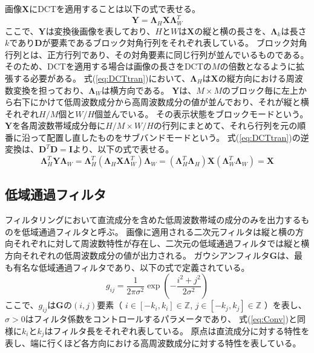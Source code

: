 \documentclass[11pt,a4paper]{jsarticle}
\begin{document}
画像$\mathbf{X}$にDCTを適用することは以下の式で表せる。
\begin{equation}
	\mathbf{Y}=\mathbf{\Lambda}_H
	\mathbf{X\Lambda}^T_W
	\label{eq:DCTtran}
\end{equation}
ここで、$\mathbf{Y}$は変換後画像を表しており、$H$と$W$は$\mathbf{X}$の縦と横の長さを、$\mathbf{\Lambda}_k$は長さ$k$であり$\mathbf{D}$が要素であるブロック対角行列をそれぞれ表している。
ブロック対角行列とは、正方行列であり、その対角要素に同じ行列が並んでいるものである。
そのため、DCTを適用する場合は画像の長さをDCTの$M$の倍数となるように拡張する必要がある。
式(\ref{eq:DCTtran})において、$\mathbf{\Lambda}_H$は$\mathbf{X}$の縦方向における周波数変換を担っており、$\mathbf{\Lambda}_W$は横方向である。
$\mathbf{Y}$は、$M\times M$のブロック毎に左上から右下にかけて低周波数成分から高周波数成分の値が並んでおり、それが縦と横それぞれ$H/M$個と$W/H$個並んでいる。
その表示状態をブロックモードという。
$\mathbf{Y}$を各周波数帯域成分毎に$H/M\times W/H$の行列にまとめて、それら行列を元の順番に沿って配置し直したものをサブバンドモードという。
式(\ref{eq:DCTtran})の逆変換は、$\mathbf{D}^{T}\mathbf{D}=\mathbf{I}$より、以下の式で表せる。
\begin{equation}
	\mathbf{\Lambda}^T_H\mathbf{Y\Lambda}_W
	=\mathbf{\Lambda}^T_H
	\left( \mathbf{\Lambda}_H\mathbf{X\Lambda}^T_W\right)\mathbf{\Lambda}_W
	=\left(\mathbf{\Lambda}^T_H\mathbf{\Lambda}_H\right)
	\mathbf{X}
	\left(\mathbf{\Lambda}^T_W\mathbf{\Lambda}_W\right)
	=\mathbf{X}
	\label{eq:DCTtran_inv}
\end{equation}


\subsection{低域通過フィルタ}\label{sec:Lowpassfilter}
フィルタリングにおいて直流成分を含めた低周波数帯域の成分のみを出力するものを低域通過フィルタと呼ぶ。
画像に適用される二次元フィルタは縦と横の方向それぞれに対して周波数特性が存在し、二次元の低域通過フィルタでは縦と横方向それぞれの低周波数成分の値が出力される。
ガウシアンフィルタ$\mathbf{G}$は、最も有名な低域通過フィルタであり、以下の式で定義されている。
\begin{equation}
	g_{ij}=\frac{1}{2\pi\sigma ^2}
	\exp(-\frac{i^2+j^2}{2\sigma ^2})
	\label{eq:Gaussian}
\end{equation}
ここで、$g_{ij}$は$\mathbf{G}$の$(i,j)$要素（
$i\in [-k_i, k_i]\in\mathbb{Z}$,
$j\in [-k_j, k_j]\in\mathbb{Z}$
）を表し、$\sigma>0$はフィルタ係数をコントロールするパラメータであり、
式(\ref{eq:Conv})と同様に$k_i$と$k_j$はフィルタ長をそれぞれ表している。
原点は直流成分に対する特性を表し、端に行くほど各方向における高周波数成分に対する特性を表している。
\end{document}
